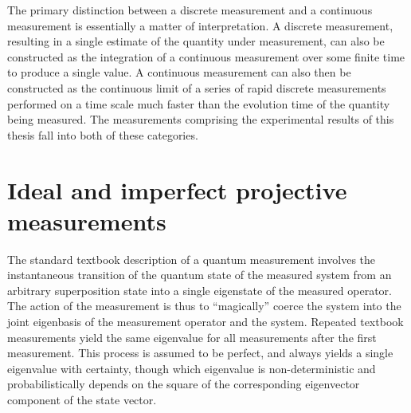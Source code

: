 The primary distinction between a discrete measurement and a continuous measurement is essentially a matter of interpretation.  A discrete measurement, resulting in a single estimate of the quantity under measurement, can also be constructed as the integration of a continuous measurement over some finite time to produce a single value.  A continuous measurement can also then be constructed as the continuous limit of a series of rapid discrete measurements performed on a time scale much faster than the evolution time of the quantity being measured.  The measurements comprising the experimental results of this thesis fall into both of these categories.

\section{Ideal and imperfect projective measurements}

The standard textbook description of a quantum measurement involves the instantaneous transition of the quantum state of the measured system from an arbitrary superposition state into a single eigenstate of the measured operator.  The action of the measurement is thus to ``magically'' coerce the system into the joint eigenbasis of the measurement operator and the system.  Repeated textbook measurements yield the same eigenvalue for all measurements after the first measurement.  This process is assumed to be perfect, and always yields a single eigenvalue with certainty, though which eigenvalue is non-deterministic and probabilistically depends on the square of the corresponding eigenvector component of the state vector.

